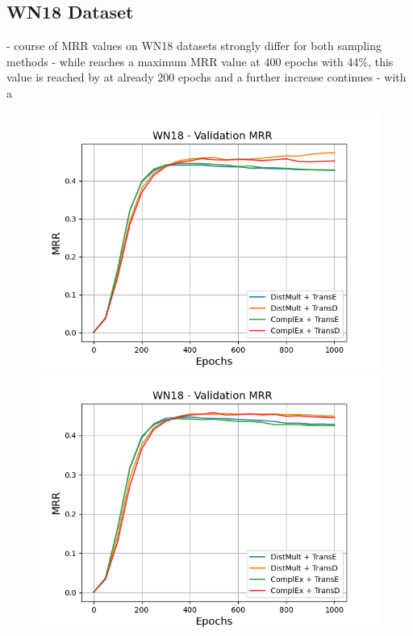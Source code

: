 \subsection{WN18 Dataset}
\label{subsec:uncertainty_wn18}

- course of MRR values on \textsc{WN18} datasets strongly differ for both sampling methods
- while \ussoftmax reaches a maximum MRR value at 400 epochs with 44\%, this value is reached by \origsampling at already 200  epochs and a further increase continues
- with \origsampling a 
\begin{figure}
    \centering
    \begin{minipage}{.5\textwidth}
      \centering
      \includegraphics[width=0.9\linewidth]{figures/results/gan_train/not_pretrained/random/wn18/random_wn18_mrrs.png}
    \end{minipage}%
    \begin{minipage}{.5\textwidth}
      \centering
      \includegraphics[width=0.9\linewidth]{figures/results/gan_train/not_pretrained/uncertainty/max_distribution/entropy/wn18/uncertainty_wn18_mrrs.png}

\end{minipage}
\end{figure}
